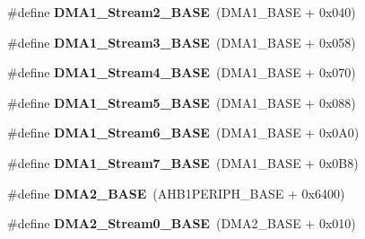\begin{DoxyCompactItemize}
\item 
\hypertarget{group___peripheral__memory__map_ga48a551ee91d3f07dd74347fdb35c703d}{\#define {\bfseries D\-M\-A1\-\_\-\-Stream2\-\_\-\-B\-A\-S\-E}~(D\-M\-A1\-\_\-\-B\-A\-S\-E + 0x040)}\label{group___peripheral__memory__map_ga48a551ee91d3f07dd74347fdb35c703d}

\item 
\hypertarget{group___peripheral__memory__map_gac51deb54ff7cfe1290dfcf517ae67127}{\#define {\bfseries D\-M\-A1\-\_\-\-Stream3\-\_\-\-B\-A\-S\-E}~(D\-M\-A1\-\_\-\-B\-A\-S\-E + 0x058)}\label{group___peripheral__memory__map_gac51deb54ff7cfe1290dfcf517ae67127}

\item 
\hypertarget{group___peripheral__memory__map_ga757a3c0d866c0fe68c6176156065a26b}{\#define {\bfseries D\-M\-A1\-\_\-\-Stream4\-\_\-\-B\-A\-S\-E}~(D\-M\-A1\-\_\-\-B\-A\-S\-E + 0x070)}\label{group___peripheral__memory__map_ga757a3c0d866c0fe68c6176156065a26b}

\item 
\hypertarget{group___peripheral__memory__map_ga0ded7bed8969fe2e2d616e7f90eb7654}{\#define {\bfseries D\-M\-A1\-\_\-\-Stream5\-\_\-\-B\-A\-S\-E}~(D\-M\-A1\-\_\-\-B\-A\-S\-E + 0x088)}\label{group___peripheral__memory__map_ga0ded7bed8969fe2e2d616e7f90eb7654}

\item 
\hypertarget{group___peripheral__memory__map_ga58998ddc40adb6361704d6c9dad08125}{\#define {\bfseries D\-M\-A1\-\_\-\-Stream6\-\_\-\-B\-A\-S\-E}~(D\-M\-A1\-\_\-\-B\-A\-S\-E + 0x0\-A0)}\label{group___peripheral__memory__map_ga58998ddc40adb6361704d6c9dad08125}

\item 
\hypertarget{group___peripheral__memory__map_ga82186dd6d3f60995d428b34c041919d7}{\#define {\bfseries D\-M\-A1\-\_\-\-Stream7\-\_\-\-B\-A\-S\-E}~(D\-M\-A1\-\_\-\-B\-A\-S\-E + 0x0\-B8)}\label{group___peripheral__memory__map_ga82186dd6d3f60995d428b34c041919d7}

\item 
\hypertarget{group___peripheral__memory__map_gab72a9ae145053ee13d1d491fb5c1df64}{\#define {\bfseries D\-M\-A2\-\_\-\-B\-A\-S\-E}~(A\-H\-B1\-P\-E\-R\-I\-P\-H\-\_\-\-B\-A\-S\-E + 0x6400)}\label{group___peripheral__memory__map_gab72a9ae145053ee13d1d491fb5c1df64}

\item 
\hypertarget{group___peripheral__memory__map_gac4c67b24726ba6b94d03adb351bcec4d}{\#define {\bfseries D\-M\-A2\-\_\-\-Stream0\-\_\-\-B\-A\-S\-E}~(D\-M\-A2\-\_\-\-B\-A\-S\-E + 0x010)}\label{group___peripheral__memory__map_gac4c67b24726ba6b94d03adb351bcec4d}


\end{DoxyCompactItemize}
